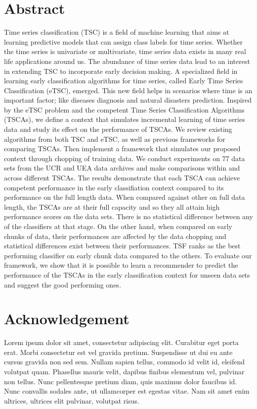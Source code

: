 
\setcounter{page}{1}
\section*{Abstract}
\thispagestyle{empty}
Time series classification (TSC) is a field of machine learning that aims at learning predictive models that can assign class labels for time series.
Whether the time series is univariate or multivariate, time series data exists in many real life applications around us.
The abundance of time series data lead to an interest in extending TSC to incorporate early decision making.
A specialized field in learning early classification algorithms for time series, called Early Time Series Classification (eTSC), emerged.
This new field helps in scenarios where time is an important factor; like diseases diagnosis and natural disasters prediction.
Inspired by the eTSC problem and the competent Time Series Classification Algorithms (TSCAs), we define a context that simulates incremental learning of time series data and study its effect on the performance of TSCAs.
We review existing algorithms from both TSC and eTSC, as well as previous frameworks for comparing TSCAs.
Then implement a framework that simulates our proposed context through chopping of training data.
We conduct experiments on 77 data sets from the UCR and UEA data archives and make comparisons within and across different TSCAs.
The results demonstrate that each TSCA can achieve competent performance in the early classifiation context compared to its performance on the full length data.
When compared against other on full data length, the TSCAs are at their full capacity and so they all attain high performance scores on the data sets.
There is no statistical difference between any of the classifiers at that stage.
On the other hand, when compared on early chunks of data, their performances are affected by the data chopping and statistical differences exist between their performances.
TSF ranks as the best performing classifier on early chunk data compared to the others.
To evaluate our framework, we show that it is possible to learn a recommender to predict the performance of the TSCAs in the early classification context for unseen data sets
and suggest the good performing ones.

\null\newpage

\section*{Acknowledgement}
\thispagestyle{empty}
Lorem ipsum dolor sit amet, consectetur adipiscing elit. Curabitur eget porta erat. Morbi consectetur est vel gravida pretium. Suspendisse ut dui eu ante cursus gravida non sed sem. Nullam sapien tellus, commodo id velit id, eleifend volutpat quam. Phasellus mauris velit, dapibus finibus elementum vel, pulvinar non tellus. Nunc pellentesque pretium diam, quis maximus dolor faucibus id. Nunc convallis sodales ante, ut ullamcorper est egestas vitae. Nam sit amet enim ultrices, ultrices elit pulvinar, volutpat risus.



\null\newpage
\thispagestyle{empty}


